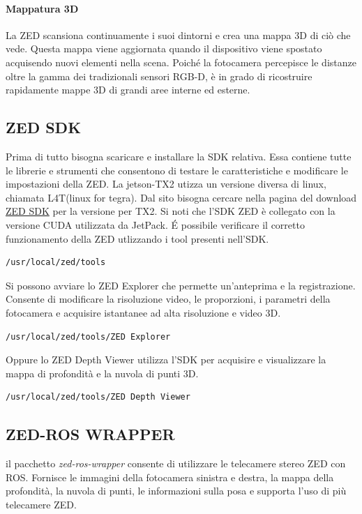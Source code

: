 \documentclass[a4paper]{article}
\begin{document}
\paragraph{Mappatura 3D}
La ZED scansiona continuamente i suoi dintorni e crea una mappa 3D di ciò che vede. Questa mappa viene aggiornata quando il dispositivo viene spostato acquisendo nuovi elementi nella scena. Poiché la fotocamera percepisce le distanze oltre la gamma dei tradizionali sensori RGB-D, è in grado di ricostruire rapidamente mappe 3D di grandi aree interne ed esterne.

\subsection{ZED SDK}
Prima di tutto bisogna scaricare e installare la SDK relativa. Essa contiene tutte le librerie e strumenti che  consentono di testare le caratteristiche e modificare le impostazioni della ZED.
La jetson-TX2 utizza un versione diversa di linux, chiamata L4T(linux for tegra). Dal sito bisogna cercare nella pagina del download 
 \href{https://www.stereolabs.com/developers/release/#sdkdownloads_anchor}{ZED SDK} per la versione per TX2. 
Si noti che l'SDK ZED è collegato con la versione CUDA utilizzata da JetPack.
\'E possibile verificare il corretto funzionamento della ZED utlizzando i tool presenti nell'SDK.
\begin{verbatim}
/usr/local/zed/tools
\end{verbatim}
Si possono avviare lo ZED Explorer che permette un'anteprima e la registrazione. Consente di modificare la risoluzione video, le proporzioni, i parametri della fotocamera e acquisire istantanee ad alta risoluzione e video 3D.
\begin{verbatim}
/usr/local/zed/tools/ZED Explorer
\end{verbatim}
Oppure lo ZED Depth Viewer utilizza l'SDK per acquisire e visualizzare la mappa di profondità e la nuvola di punti 3D.
\begin{verbatim}
/usr/local/zed/tools/ZED Depth Viewer
\end{verbatim}

\subsection{ZED-ROS WRAPPER}

il pacchetto \textit{zed-ros-wrapper} consente di utilizzare le telecamere stereo ZED con ROS. Fornisce le immagini della fotocamera sinistra e destra, la mappa della profondità, la nuvola di punti, le informazioni sulla posa e supporta l'uso di più telecamere ZED.
\end{document}
